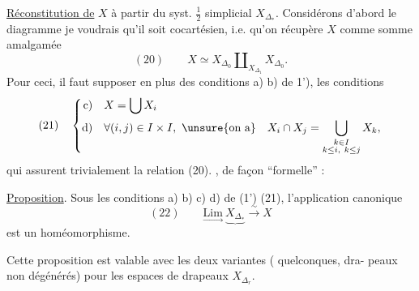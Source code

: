 \uline{Réconstitution de} $X$ à partir du syst.
$\frac12$ simplicial $X_{\Delta_*}$. Considérons d'abord
le diagramme
je voudrais qu'il soit cocartésien, i.e.
qu'on récupère $X$ comme somme amalgamée
\[
(20)\qquad X\simeq X_{\Delta_0}\amalg_{X_{\Delta_1}}X_{\Delta_0}.
\]
Pour ceci, il faut supposer en plus des
conditions a) b) de 1'), les conditions
\[
(21)\quad\left\{\begin{aligned}
\text{c)}\quad&X=\bigcup X_i\\
\text{d)}\quad&\forall(i,j)\in I\times I,\ \text{\unsure{on a}}\quad
X_i\cap X_j=\bigcup_{\substack{k\in I\\k\leq i,\ k\leq j}}X_k,
\end{aligned}\right.
\]
qui assurent trivialement la relation (20).
, de façon ``formelle'' :

\uline{Proposition}. Sous les conditions a) b) c) d)
de (1') (21), l'application canonique
\[
(22)\qquad\underset{\longrightarrow}{\mathrm{Lim}}\ \underbrace{X_{\Delta_*}}\xrightarrow{\sim}X
\]
est un homéomorphisme.

Cette proposition est valable avec les
deux variantes ( quelconques, dra-
peaux non dégénérés) pour les
espaces de drapeaux $X_{\Delta_r}$.

